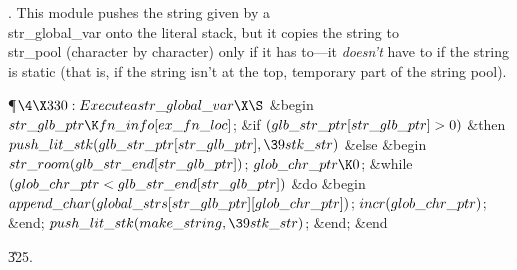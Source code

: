 .
This module pushes the string given by a \\{str\_global\_var} onto the
literal stack, but it copies the string to \\{str\_pool} (character by
character) only if it has to---it {\it doesn't\/} have to if the
string is static (that is, if the string isn't at the top, temporary
part of the string pool).

\Y\P$\4\X330:Execute a \\{str\_global\_var}\X\S$\6
\&{begin} $\\{str\_glb\_ptr}\K\\{fn\_info}[\\{ex\_fn\_loc}]$;\6
\&{if} $(\\{glb\_str\_ptr}[\\{str\_glb\_ptr}]>0)$ \1\&{then}\6
$\\{push\_lit\_stk}(\\{glb\_str\_ptr}[\\{str\_glb\_ptr}],\39\\{stk\_str})$\6
\4\&{else} \&{begin} $\\{str\_room}(\\{glb\_str\_end}[\\{str\_glb\_ptr}])$;\5
$\\{glob\_chr\_ptr}\K0$;\6
\&{while} $(\\{glob\_chr\_ptr}<\\{glb\_str\_end}[\\{str\_glb\_ptr}])$ \1\&{do}%
\6
\&{begin} $\\{append\_char}(\\{global\_strs}[\\{str\_glb\_ptr}][\\{glob\_chr%
\_ptr}])$;\5
$\\{incr}(\\{glob\_chr\_ptr})$;\6
\&{end};\2\6
$\\{push\_lit\_stk}(\\{make\_string},\39\\{stk\_str})$;\6
\&{end};\2\6
\&{end}\par
\U325.\fi

